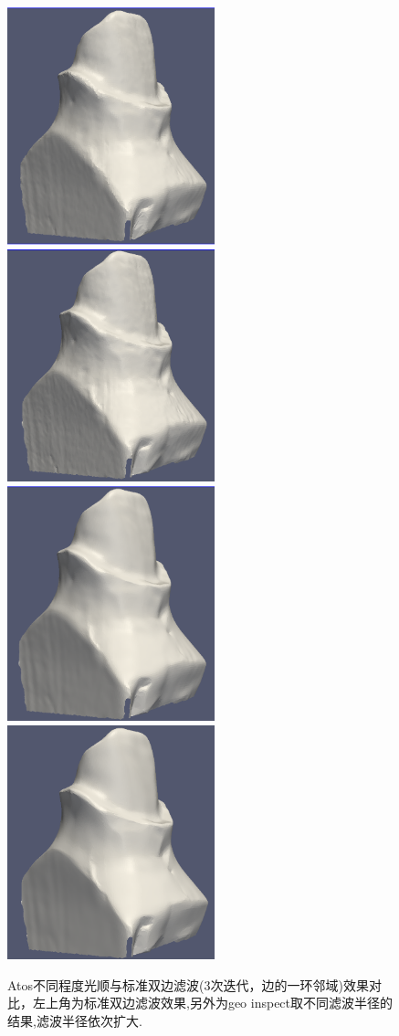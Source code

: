 \documentclass{article}
\theoremstyle{definition}
\theoremstyle{remark}
\begin{document}
\begin{figure}[H]
	\onecolumn
	\includegraphics[width=6cm]{our_basic}
	\includegraphics[width=6cm]{smooth_0}
	\includegraphics[width=6cm]{smooth_1}
	\includegraphics[width=6cm]{smooth_2}
	\caption[效果对比]
	{Atos不同程度光顺与标准双边滤波(3次迭代，边的一环邻域)效果对比，左上角为标准双边滤波效果,另外为geo inspect取不同滤波半径的结果,滤波半径依次扩大.}
	\centering
\end{figure}
\end{document}
